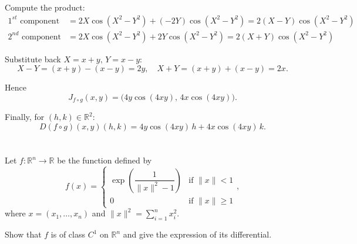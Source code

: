 \documentclass[12pt]{article}
\begin{document}
\begin{correctionbox}
Compute the product:
\[
\begin{aligned}
\text{$1^{st}$ component} &= 2X\cos(X^2-Y^2) + (-2Y)\cos(X^2-Y^2) = 2(X-Y)\cos(X^2-Y^2)\\
\text{$2^{nd}$ component} &= 2X\cos(X^2-Y^2) + 2Y\cos(X^2-Y^2) = 2(X+Y)\cos(X^2-Y^2)
\end{aligned}
\]

Substitute back \(X=x+y,\,Y=x-y\):
\[
X-Y=(x+y)-(x-y)=2y,\quad X+Y=(x+y)+(x-y)=2x.
\]

Hence
\[
\boxed{J_{f\circ g}(x,y) = \big(4y \cos(4xy),\, 4x \cos(4xy)\big)}.
\]

\medskip
Finally, for \((h,k)\in\mathbb{R}^2\):
\[
\boxed{D(f\circ g)(x,y)(h,k) = 4y \cos(4xy)\,h + 4x \cos(4xy)\,k}.
\]
\end{correctionbox}

\section{}
Let $f : \mathbb{R}^n \to \mathbb{R}$ be the function defined by
$$f(x) = \begin{cases}
\exp\left(\dfrac{1}{\|x\|^2 - 1}\right) & \text{if } \|x\| < 1 \\[0.5em]
0 & \text{if } \|x\| \geq 1
\end{cases},$$
where $x = (x_1, \ldots, x_n)$ and $\|x\|^2 = \displaystyle\sum_{i=1}^{n} x_i^2$.

Show that $f$ is of class $C^1$ on $\mathbb{R}^n$ and give the expression of its differential.
\end{document}
